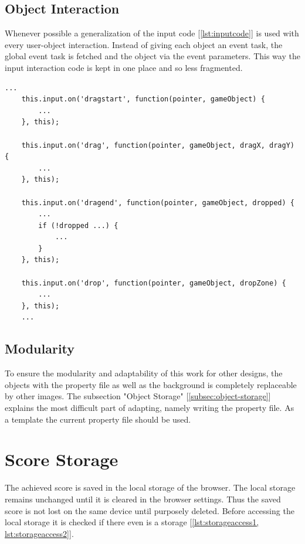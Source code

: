 \subsection{Object Interaction}\label{subsec:object-interaction}
Whenever possible a generalization of the input code [\ref{lst:inputcode}] is used with every user-object interaction.
Instead of giving each object an event task, the global event task is fetched and the object via the event parameters.
This way the input interaction code is kept in one place and so less fragmented.

\begin{lstlisting}[style=TypeScript, caption={Input code}, label={lst:inputcode}]
    ...
    this.input.on('dragstart', function(pointer, gameObject) {
        ...
    }, this);

    this.input.on('drag', function(pointer, gameObject, dragX, dragY) {
        ...
    }, this);

    this.input.on('dragend', function(pointer, gameObject, dropped) {
        ...
        if (!dropped ...) {
            ...
        }
    }, this);

    this.input.on('drop', function(pointer, gameObject, dropZone) {
        ...
    }, this);
    ...
\end{lstlisting}

\subsection{Modularity}\label{subsec:modularity}
To ensure the modularity and adaptability of this work for other designs,
the objects with the property file as well as the background is completely replaceable by other images.
The subsection "Object Storage" [\ref{subsec:object-storage}] explains the most difficult part of adapting, namely
writing the property file. As a template the current property file should be used.

\section{Score Storage}\label{sec:scorestorage}
The achieved score is saved in the local storage\cite{webstorage} of the browser.
The local storage remains unchanged until it is cleared in the browser settings.
Thus the saved score is not lost on the same device until purposely deleted.
Before accessing the local storage it is checked if there even is a storage [\ref{lst:storageaccess1, lst:storageaccess2}].

